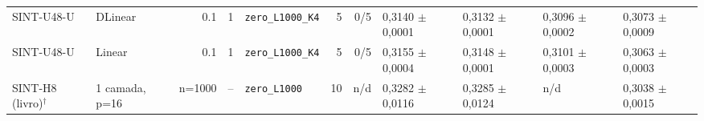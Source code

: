 \begin{longtable}{llrrlrrllll}
SINT-U48-U & DLinear & 0.1 & 1 & \texttt{zero\_\allowbreak{}L1000\_\allowbreak{}K4} & 5 & 0/5 & 0,3140 $\pm$ 0,0001 & 0,3132 $\pm$ 0,0001 & 0,3096 $\pm$ 0,0002 & 0,3073 $\pm$ 0,0009 \\
SINT-U48-U & Linear & 0.1 & 1 & \texttt{zero\_\allowbreak{}L1000\_\allowbreak{}K4} & 5 & 0/5 & 0,3155 $\pm$ 0,0004 & 0,3148 $\pm$ 0,0001 & 0,3101 $\pm$ 0,0003 & 0,3063 $\pm$ 0,0003 \\
SINT-H8 (livro)$^\dagger$ & 1 camada, p=16 & n=1000 & -- & \texttt{zero\_\allowbreak{}L1000} & 10 & n/d & 0,3282 $\pm$ 0,0116 & 0,3285 $\pm$ 0,0124 & n/d & 0,3038 $\pm$ 0,0015 \\
\end{longtable}
\normalsize

